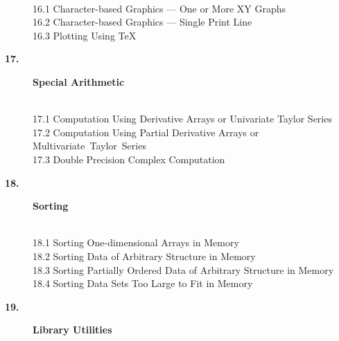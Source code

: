 \documentclass[twoside]{MATH77}
\begin{document}
\begin{description}
\vspace{-20pt}
\begin{tabbing}
\hspace{.45in}\=\\
16.1 \> Character-based Graphics --- One or More XY Graphs\\
16.2 \> Character-based Graphics --- Single Print Line\\
16.3 \> Plotting Using \TeX \\
\end{tabbing}\vspace{-15pt}

\item[\large \bf 17.]  {\large {\bf Special Arithmetic}}

\vspace{-20pt}
\begin{tabbing}
\hspace{.45in}\=\\
17.1 \> Computation Using Derivative Arrays or Univariate Taylor Series\\
17.2 \> Computation Using Partial Derivative Arrays or
Multivariate~Taylor~Series\\
17.3 \> Double Precision Complex Computation\\
\end{tabbing}\vspace{-15pt}

\item[\large \bf 18.]  {\large {\bf Sorting}}

\vspace{-20pt}
\begin{tabbing}
\hspace{.45in}\=\\
18.1 \> Sorting One-dimensional Arrays in Memory\\
18.2 \> Sorting Data of Arbitrary Structure in Memory\\
18.3 \> Sorting Partially Ordered Data of Arbitrary Structure in Memory\\
18.4 \> Sorting Data Sets Too Large to Fit in Memory\\
\end{tabbing}\vspace{-15pt}

\item[\large \bf 19.] {\large {\bf Library Utilities}}


\end{description}
\end{document}
